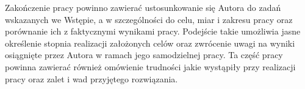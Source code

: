 Zakończenie pracy powinno zawierać ustosunkowanie się Autora do zadań wskazanych we Wstępie, a w szczególności do celu, miar i zakresu pracy oraz porównanie ich z faktycznymi wynikami pracy. Podejście takie umożliwia jasne określenie stopnia realizacji założonych celów oraz zwrócenie uwagi na wyniki osiągnięte przez Autora w ramach jego samodzielnej pracy. Ta część pracy powinna zawierać również omówienie trudności jakie wystąpiły przy realizacji pracy oraz zalet i wad przyjętego rozwiązania.
